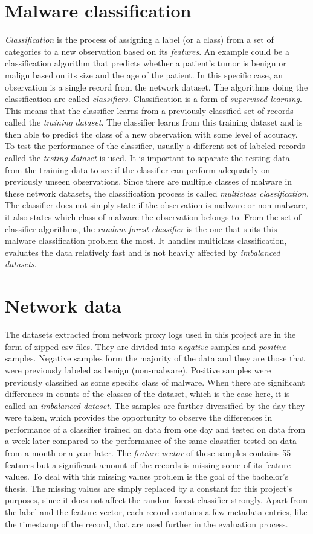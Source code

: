 \documentclass{article}
\begin{document}
  \section{Malware classification}
    {\it Classification} is the process of assigning a label (or a class) from a set of categories to a new observation based on its {\it features}. An example could be a classification algorithm that predicts whether a patient's tumor is benign or malign based on its size and the age of the patient. In this specific case, an observation is a single record from the network dataset. The algorithms doing the classification are called {\it classifiers}. Classification is a form of {\it supervised learning}. This means that the classifier learns from a previously classified set of records called the {\it training dataset}. The classifier learns from this training dataset and is then able to predict the class of a new observation with some level of accuracy. To test the performance of the classifier, usually a different set of labeled records called the {\it testing dataset} is used. It is important to separate the testing data from the training data to see if the classifier can perform adequately on previously unseen observations. Since there are multiple classes of malware in these network datasets, the classification process is called {\it multiclass classification}. The classifier does not simply state if the observation is malware or non-malware, it also states which class of malware the observation belongs to. From the set of classifier algorithms, the {\it random forest classifier} is the one that suits this malware classification problem the most. It handles multiclass classification, evaluates the data relatively fast and is not heavily affected by {\it imbalanced datasets}.
  \section{Network data}
    The datasets extracted from network proxy logs used in this project are in the form of zipped csv files. They are divided into {\it negative} samples and {\it positive} samples. Negative samples form the majority of the data and they are those that were previously labeled as benign (non-malware). Positive samples were previously classified as some specific class of malware. When there are significant differences in counts of the classes of the dataset, which is the case here, it is called an {\it imbalanced dataset}. The samples are further diversified by the day they were taken, which provides the opportunity to observe the differences in performance of a classifier trained on data from one day and tested on data from a week later compared to the performance of the same classifier tested on data from a month or a year later. The {\it feature vector} of these samples contains 55 features but a significant amount of the records is missing some of its feature values. To deal with this missing values problem is the goal of the bachelor's thesis. The missing values are simply replaced by a constant for this project's purposes, since it does not affect the random forest classifier strongly. Apart from the label and the feature vector, each record contains a few metadata entries, like the timestamp of the record, that are used further in the evaluation process.
  \newpage
\end{document}
